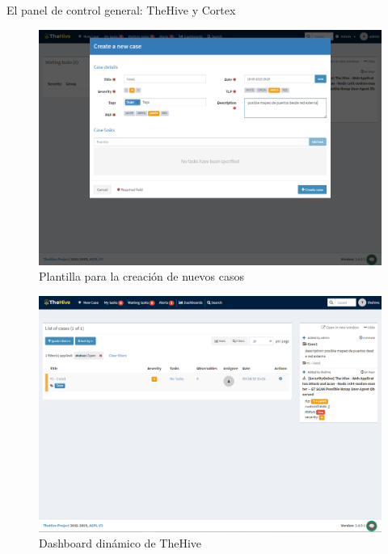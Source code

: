\begin{subsection}{El panel de control general: TheHive y Cortex}
        \begin{figure}[H]
        \centering
        \includegraphics[width=1\textwidth]{./iteracion_1_imagenes/figura_24_plantilla_creacion_casos.png}
        \caption{Plantilla para la creación de nuevos casos}
        \label{fig:figura_24_plantilla_nuevos_casos}
     \end{figure}
     \begin{figure}[H]
        \centering
        \includegraphics[width=1\textwidth]{./iteracion_1_imagenes/figura_25_dashboard_dinamico_thehive.png}
        \caption{Dashboard dinámico de TheHive}
        \label{fig:dashboard_dinamico}
     \end{figure}
     \FloatBarrier

\end{subsection}
